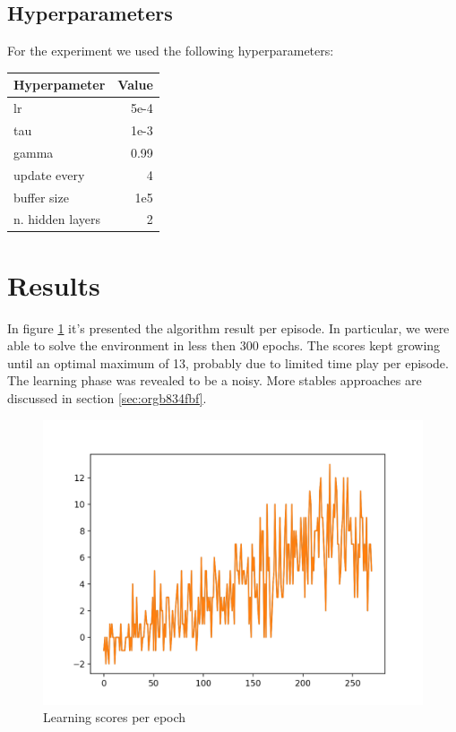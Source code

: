 \documentclass[11pt]{article}
\begin{document}
\subsection{Hyperparameters}
\label{sec:orgfa20538}
For the experiment we used the following hyperparameters:

\begin{center}
\begin{tabular}{lr}
Hyperpameter & Value\\
\hline
lr & 5e-4\\
tau & 1e-3\\
gamma & 0.99\\
update every & 4\\
buffer size & 1e5\\
n. hidden layers & 2\\
\hline
\end{tabular}
\end{center}


\section{Results}
\label{sec:orgd9474a1}
In figure \ref{fig:orga51d052} it's presented the algorithm result per episode. In
particular, we were able to solve the environment in less then 300 epochs. The
scores kept growing until an optimal maximum of 13, probably due to limited time
play per episode. The learning phase was revealed to be a noisy. More stables
approaches are discussed in section \ref{sec:orgb834fbf}. 

\begin{figure}[htbp]
\centering
\includegraphics[width=.9\linewidth]{./contents/agent.png}
\caption{\label{fig:orga51d052}Learning scores per epoch}
\end{figure}
\end{document}
